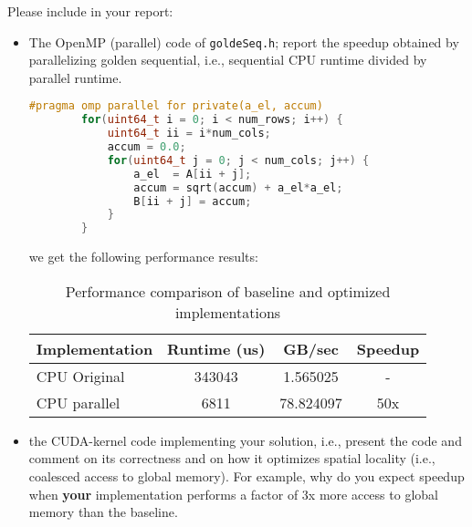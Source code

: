 \documentclass{article}
\begin{document}
Please include in your report:

\begin{itemize}
    \item The OpenMP (parallel) code of \texttt{goldeSeq.h}; report the speedup obtained
   by parallelizing golden sequential, i.e., sequential CPU runtime divided by
   parallel runtime.

    \begin{lstlisting}[language=c]
        #pragma omp parallel for private(a_el, accum)
        for(uint64_t i = 0; i < num_rows; i++) {
            uint64_t ii = i*num_cols;
            accum = 0.0;
            for(uint64_t j = 0; j < num_cols; j++) {
                a_el  = A[ii + j];
                accum = sqrt(accum) + a_el*a_el;
                B[ii + j] = accum;
            }
        }
    \end{lstlisting}
    
    

    we get the following performance results:

    \begin{table}[h]
        \centering
        \begin{tabular}{|l|c|c|c|}
        \hline
        \textbf{Implementation} & \textbf{Runtime (us)} & \textbf{GB/sec} & \textbf{Speedup} \\
        \hline
        CPU Original & 343043 & 1.565025 & - \\
        CPU parallel & 6811 & 78.824097 & 50x \\
        \hline
        \end{tabular}
        \caption{Performance comparison of baseline and optimized implementations}
        \label{tab:performance-comparison}
    \end{table}

    
    \item the CUDA-kernel code implementing your solution, i.e., present the code and comment on
    its correctness and on how it optimizes spatial locality (i.e., coalesced
    access to global memory). For example, why do
    you expect speedup when \textbf{your} implementation
    performs a factor of 3x more access to global
    memory than the baseline.


\end{itemize}
\end{document}
